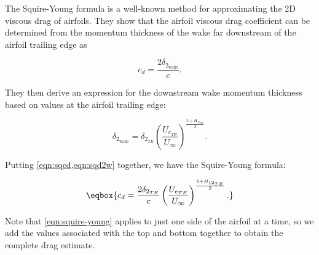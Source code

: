 The Squire-Young formula is a well-known method for approximating the 2D viscous drag of airfoils.
They show that the airfoil viscous drag coefficient can be determined from the momentum thickness of the wake far downstream of the airfoil trailing edge as

\begin{equation}
\label{eqn:sqcd}
    c_d = \frac{2 \delta_{2_\mathrm{wake}}}{c}.
\end{equation}

\noindent They then derive an expression for the downstream wake momentum thickness based on values at the airfoil trailing edge:

\begin{equation}
\label{eqn:sqd2w}
    \delta_{2_\mathrm{wake}} = \delta_{2_{TE}} \left(\frac{U_{e_{TE}}}{U_\infty}\right)^{\frac{5+H_{12_{TE}}}{2}}.
\end{equation}

\noindent Putting \cref{eqn:sqcd,eqn:sqd2w} together, we have the Squire-Young formula:

\begin{equation}
\label{eqn:squire-young}
\eqbox{
    c_d = \frac{2 \delta_{2_{TE}}}{c} \left(\frac{U_{e_{TE}}}{U_\infty}\right)^{\frac{5+H_{12_{TE}}}{2}}.
}
\end{equation}





\noindent Note that \cref{eqn:squire-young} applies to just one side of the airfoil at a time, so we add the values associated with the top and bottom together to obtain the complete drag estimate.

